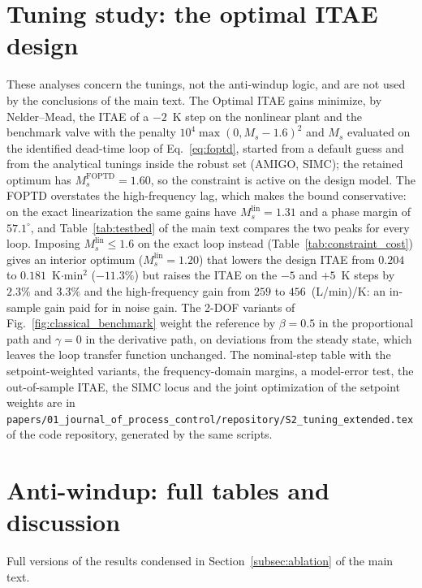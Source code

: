 \documentclass[11pt]{article}
\begin{document}
\section{Tuning study: the optimal ITAE design}\label{supp:tuning}
These analyses concern the tunings, not the anti-windup logic, and are not used by the conclusions of the main text. The Optimal ITAE gains minimize, by Nelder--Mead, the ITAE of a $-2$~K step on the nonlinear plant and the benchmark valve with the penalty $10^4\max(0, M_s - 1.6)^2$ and $M_s$ evaluated on the identified dead-time loop of Eq.~\eqref{eq:foptd}, started from a default guess and from the analytical tunings inside the robust set (AMIGO, SIMC); the retained optimum has $M_s^{\mathrm{FOPTD}} = 1.60$, so the constraint is active on the design model. The FOPTD overstates the high-frequency lag, which makes the bound conservative: on the exact linearization the same gains have $M_s^{\mathrm{lin}} = 1.31$ and a phase margin of $57.1^\circ$, and Table~\ref{tab:testbed} of the main text compares the two peaks for every loop. Imposing $M_s^{\mathrm{lin}} \le 1.6$ on the exact loop instead (Table~\ref{tab:constraint_cost}) gives an interior optimum ($M_s^{\mathrm{lin}} = 1.20$) that lowers the design ITAE from $0.204$ to $0.181$~K$\cdot$min$^2$ ($-11.3\%$) but raises the ITAE on the $-5$ and $+5$~K steps by $2.3\%$ and $3.3\%$ and the high-frequency gain from $259$ to $456$~(L/min)/K: an in-sample gain paid for in noise gain. The 2-DOF variants of Fig.~\ref{fig:classical_benchmark} weight the reference by $\beta = 0.5$ in the proportional path and $\gamma = 0$ in the derivative path, on deviations from the steady state, which leaves the loop transfer function unchanged. The nominal-step table with the setpoint-weighted variants, the frequency-domain margins, a model-error test, the out-of-sample ITAE, the SIMC locus and the joint optimization of the setpoint weights are in \texttt{papers/01\_journal\_of\_process\_control/repository/S2\_tuning\_extended.tex} of the code repository, generated by the same scripts.



\section{Anti-windup: full tables and discussion}\label{supp:aw}
Full versions of the results condensed in Section~\ref{subsec:ablation} of the main text.
\end{document}
